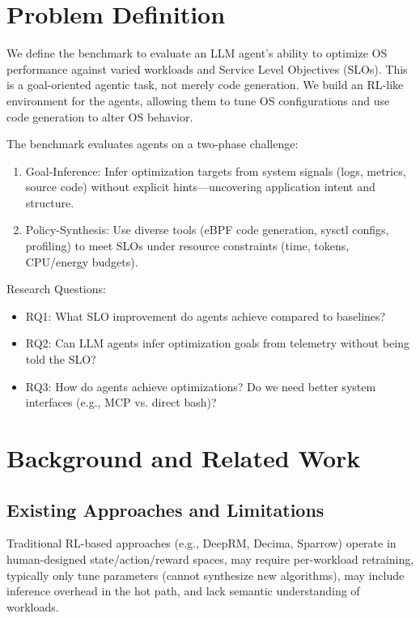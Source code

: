 \documentclass{article}
\begin{document}
\section{Problem Definition}

We define the benchmark to evaluate an LLM agent's ability to optimize OS performance against varied workloads and Service Level Objectives (SLOs). This is a goal-oriented agentic task, not merely code generation. We build an RL-like environment for the agents, allowing them to tune OS configurations and use code generation to alter OS behavior.

The benchmark evaluates agents on a two-phase challenge:
\begin{enumerate}[nosep]
    \item Goal-Inference: Infer optimization targets from system signals (logs, metrics, source code) without explicit hints---uncovering application intent and structure.
    \item Policy-Synthesis: Use diverse tools (eBPF code generation, sysctl configs, profiling) to meet SLOs under resource constraints (time, tokens, CPU/energy budgets).
\end{enumerate}

Research Questions:
\begin{itemize}[nosep]
    \item RQ1: What SLO improvement do agents achieve compared to baselines?
    \item RQ2: Can LLM agents infer optimization goals from telemetry without being told the SLO?
    \item RQ3: How do agents achieve optimizations? Do we need better system interfaces (e.g., MCP vs. direct bash)?
\end{itemize}

\section{Background and Related Work}

\subsection{Existing Approaches and Limitations}

Traditional RL-based approaches (e.g., DeepRM, Decima, Sparrow) operate in human-designed state/action/reward spaces, may require per-workload retraining, typically only tune parameters (cannot synthesize new algorithms), may include inference overhead in the hot path, and lack semantic understanding of workloads.
\end{document}
